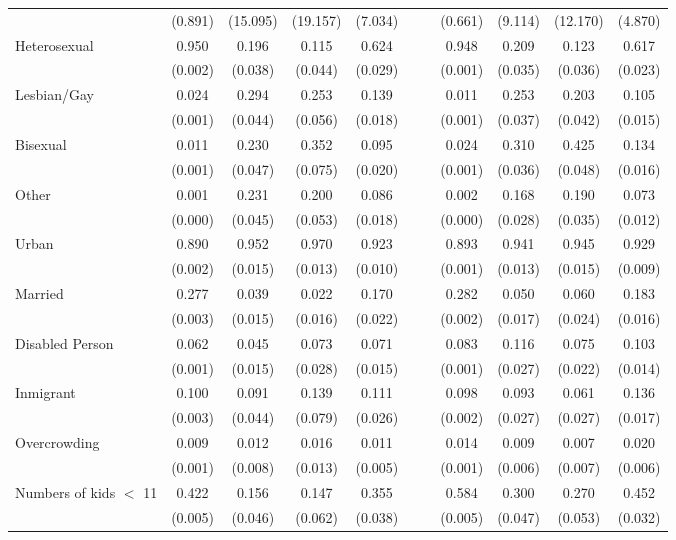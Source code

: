 \begin{table}[htbp]
{\begin{tabular}{lccccc|ccccc}
 & (0.891) & (15.095) & (19.157) & (7.034) &  &  & (0.661) & (9.114) & (12.170) & (4.870) \\
Heterosexual & 0.950 & 0.196 & 0.115 & 0.624 &  &  & 0.948 & 0.209 & 0.123 & 0.617 \\
 & (0.002) & (0.038) & (0.044) & (0.029) &  &  & (0.001) & (0.035) & (0.036) & (0.023) \\
Lesbian/Gay & 0.024 & 0.294 & 0.253 & 0.139 &  &  & 0.011 & 0.253 & 0.203 & 0.105 \\
 & (0.001) & (0.044) & (0.056) & (0.018) &  &  & (0.001) & (0.037) & (0.042) & (0.015) \\
Bisexual & 0.011 & 0.230 & 0.352 & 0.095 &  &  & 0.024 & 0.310 & 0.425 & 0.134 \\
 & (0.001) & (0.047) & (0.075) & (0.020) &  &  & (0.001) & (0.036) & (0.048) & (0.016) \\
Other & 0.001 & 0.231 & 0.200 & 0.086 &  &  & 0.002 & 0.168 & 0.190 & 0.073 \\
 & (0.000) & (0.045) & (0.053) & (0.018) &  &  & (0.000) & (0.028) & (0.035) & (0.012) \\
Urban & 0.890 & 0.952 & 0.970 & 0.923 &  &  & 0.893 & 0.941 & 0.945 & 0.929 \\
 & (0.002) & (0.015) & (0.013) & (0.010) &  &  & (0.001) & (0.013) & (0.015) & (0.009) \\
Married & 0.277 & 0.039 & 0.022 & 0.170 &  &  & 0.282 & 0.050 & 0.060 & 0.183 \\
 & (0.003) & (0.015) & (0.016) & (0.022) &  &  & (0.002) & (0.017) & (0.024) & (0.016) \\
Disabled Person & 0.062 & 0.045 & 0.073 & 0.071 &  &  & 0.083 & 0.116 & 0.075 & 0.103 \\
 & (0.001) & (0.015) & (0.028) & (0.015) &  &  & (0.001) & (0.027) & (0.022) & (0.014) \\
Inmigrant & 0.100 & 0.091 & 0.139 & 0.111 &  &  & 0.098 & 0.093 & 0.061 & 0.136 \\
 & (0.003) & (0.044) & (0.079) & (0.026) &  &  & (0.002) & (0.027) & (0.027) & (0.017) \\
Overcrowding & 0.009 & 0.012 & 0.016 & 0.011 &  &  & 0.014 & 0.009 & 0.007 & 0.020 \\
 & (0.001) & (0.008) & (0.013) & (0.005) &  &  & (0.001) & (0.006) & (0.007) & (0.006) \\
Numbers of kids $<$ 11 & 0.422 & 0.156 & 0.147 & 0.355 &  &  & 0.584 & 0.300 & 0.270 & 0.452 \\
 & (0.005) & (0.046) & (0.062) & (0.038) &  &  & (0.005) & (0.047) & (0.053) & (0.032) \\

\end{tabular}}
\end{table}
